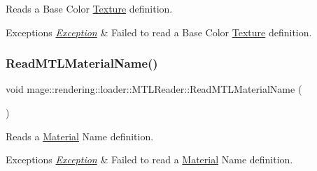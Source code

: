Reads a Base Color \hyperlink{classmage_1_1rendering_1_1_texture}{Texture} definition.


\begin{DoxyExceptions}{Exceptions}
{\em \hyperlink{classmage_1_1_exception}{Exception}} & Failed to read a Base Color \hyperlink{classmage_1_1rendering_1_1_texture}{Texture} definition. \\
\hline
\end{DoxyExceptions}
\hypertarget{classmage_1_1rendering_1_1loader_1_1_m_t_l_reader_ab123422945f5937ffe484c1076a6858b}{}\label{classmage_1_1rendering_1_1loader_1_1_m_t_l_reader_ab123422945f5937ffe484c1076a6858b} 
\subsubsection{\texorpdfstring{Read\+M\+T\+L\+Material\+Name()}{ReadMTLMaterialName()}}
{\footnotesize\ttfamily void mage\+::rendering\+::loader\+::\+M\+T\+L\+Reader\+::\+Read\+M\+T\+L\+Material\+Name (\begin{DoxyParamCaption}{ }\end{DoxyParamCaption})\hspace{0.3cm}{\ttfamily [private]}}

Reads a \hyperlink{classmage_1_1rendering_1_1_material}{Material} Name definition.


\begin{DoxyExceptions}{Exceptions}
{\em \hyperlink{classmage_1_1_exception}{Exception}} & Failed to read a \hyperlink{classmage_1_1rendering_1_1_material}{Material} Name definition. \\
\hline
\end{DoxyExceptions}
\hypertarget{classmage_1_1rendering_1_1loader_1_1_m_t_l_reader_a62b4c2d4106fb11f55af6a7de29ad37a}{}\label{classmage_1_1rendering_1_1loader_1_1_m_t_l_reader_a62b4c2d4106fb11f55af6a7de29ad37a} 
